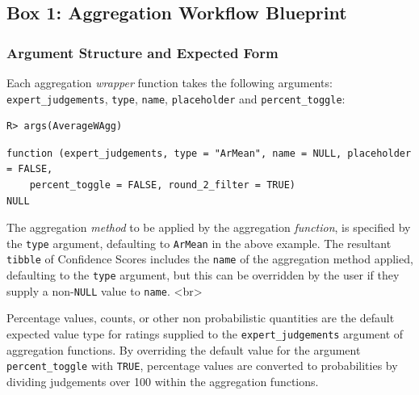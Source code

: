 \documentclass[article]{jss}
\begin{document}
\begin{tcolorbox}[enhanced jigsaw, arc=.35mm, bottomrule=.15mm, breakable, colback=white, colframe=quarto-callout-color-frame, left=2mm, leftrule=.75mm, opacityback=0, rightrule=.15mm, toprule=.15mm]

\protect{}\label{aggWorkflow}
\subsection*{Box 1: Aggregation Workflow
Blueprint}\label{box-1-aggregation-workflow-blueprint}

\subsubsection{Argument Structure and Expected
Form}\label{argument-structure-and-expected-form}

Each aggregation \emph{wrapper} function takes the following arguments:
\texttt{expert\_judgements}, \texttt{type}, \texttt{name},
\texttt{placeholder} and \texttt{percent\_toggle}:

\begin{verbatim}
R> args(AverageWAgg)
\end{verbatim}

\begin{verbatim}
function (expert_judgements, type = "ArMean", name = NULL, placeholder = FALSE, 
    percent_toggle = FALSE, round_2_filter = TRUE) 
NULL
\end{verbatim}

The aggregation \emph{method} to be applied by the aggregation
\emph{function}, is specified by the \texttt{type} argument, defaulting
to \texttt{ArMean} in the above example. The resultant \texttt{tibble}
of Confidence Scores includes the \texttt{name} of the aggregation
method applied, defaulting to the \texttt{type} argument, but this can
be overridden by the user if they supply a non-\texttt{NULL} value to
\texttt{name}. \textless br\textgreater{}

Percentage values, counts, or other non probabilistic quantities are the
default expected value type for ratings supplied to the
\texttt{expert\_judgements} argument of aggregation functions. By
overriding the default value for the argument \texttt{percent\_toggle}
with \texttt{TRUE}, percentage values are converted to probabilities by
dividing judgements over 100 within the aggregation functions.


\end{tcolorbox}
\end{document}
